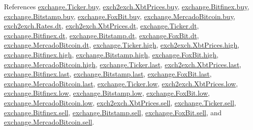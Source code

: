 References \hyperlink{exchange_8py_source_l00058}{exchange.\+Ticker.\+buy}, \hyperlink{exch2exch_8py_source_l00059}{exch2exch.\+Xbt\+Prices.\+buy}, \hyperlink{exchange_8py_source_l00331}{exchange.\+Bitfinex.\+buy}, \hyperlink{exchange_8py_source_l00400}{exchange.\+Bitstamp.\+buy}, \hyperlink{exchange_8py_source_l00472}{exchange.\+Fox\+Bit.\+buy}, \hyperlink{exchange_8py_source_l00534}{exchange.\+Mercado\+Bitcoin.\+buy}, \hyperlink{exch2exch_8py_source_l00028}{exch2exch.\+Rates.\+dt}, \hyperlink{exch2exch_8py_source_l00057}{exch2exch.\+Xbt\+Prices.\+dt}, \hyperlink{exchange_8py_source_l00057}{exchange.\+Ticker.\+dt}, \hyperlink{exchange_8py_source_l00338}{exchange.\+Bitfinex.\+dt}, \hyperlink{exchange_8py_source_l00407}{exchange.\+Bitstamp.\+dt}, \hyperlink{exchange_8py_source_l00471}{exchange.\+Fox\+Bit.\+dt}, \hyperlink{exchange_8py_source_l00541}{exchange.\+Mercado\+Bitcoin.\+dt}, \hyperlink{exchange_8py_source_l00060}{exchange.\+Ticker.\+high}, \hyperlink{exch2exch_8py_source_l00061}{exch2exch.\+Xbt\+Prices.\+high}, \hyperlink{exchange_8py_source_l00333}{exchange.\+Bitfinex.\+high}, \hyperlink{exchange_8py_source_l00402}{exchange.\+Bitstamp.\+high}, \hyperlink{exchange_8py_source_l00474}{exchange.\+Fox\+Bit.\+high}, \hyperlink{exchange_8py_source_l00536}{exchange.\+Mercado\+Bitcoin.\+high}, \hyperlink{exchange_8py_source_l00062}{exchange.\+Ticker.\+last}, \hyperlink{exch2exch_8py_source_l00063}{exch2exch.\+Xbt\+Prices.\+last}, \hyperlink{exchange_8py_source_l00335}{exchange.\+Bitfinex.\+last}, \hyperlink{exchange_8py_source_l00404}{exchange.\+Bitstamp.\+last}, \hyperlink{exchange_8py_source_l00476}{exchange.\+Fox\+Bit.\+last}, \hyperlink{exchange_8py_source_l00538}{exchange.\+Mercado\+Bitcoin.\+last}, \hyperlink{exchange_8py_source_l00061}{exchange.\+Ticker.\+low}, \hyperlink{exch2exch_8py_source_l00062}{exch2exch.\+Xbt\+Prices.\+low}, \hyperlink{exchange_8py_source_l00334}{exchange.\+Bitfinex.\+low}, \hyperlink{exchange_8py_source_l00403}{exchange.\+Bitstamp.\+low}, \hyperlink{exchange_8py_source_l00475}{exchange.\+Fox\+Bit.\+low}, \hyperlink{exchange_8py_source_l00537}{exchange.\+Mercado\+Bitcoin.\+low}, \hyperlink{exch2exch_8py_source_l00058}{exch2exch.\+Xbt\+Prices.\+sell}, \hyperlink{exchange_8py_source_l00059}{exchange.\+Ticker.\+sell}, \hyperlink{exchange_8py_source_l00332}{exchange.\+Bitfinex.\+sell}, \hyperlink{exchange_8py_source_l00401}{exchange.\+Bitstamp.\+sell}, \hyperlink{exchange_8py_source_l00473}{exchange.\+Fox\+Bit.\+sell}, and \hyperlink{exchange_8py_source_l00535}{exchange.\+Mercado\+Bitcoin.\+sell}.


